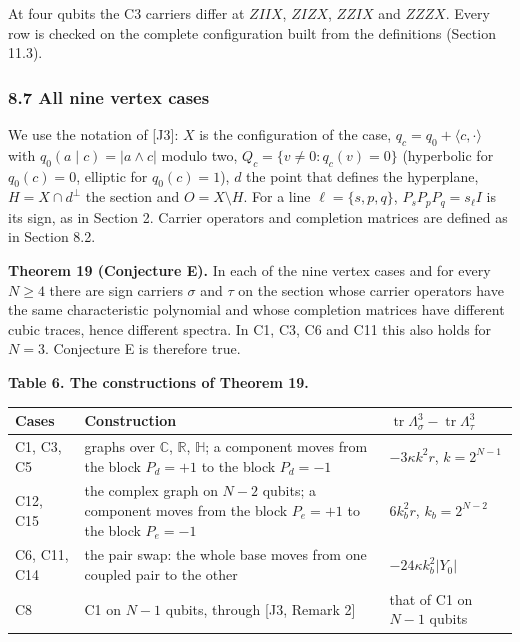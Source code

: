 \documentclass[11pt,a4paper]{article}
\begin{document}
At four qubits the C3 carriers differ at \(ZIIX\), \(ZIZX\), \(ZZIX\) and \(ZZZX\). Every row is checked on the
complete configuration built from the definitions (Section 11.3).

\subsubsection{8.7 All nine vertex cases}\label{87-all-nine-vertex-cases}

We use the notation of {[}J3{]}: \(X\) is the configuration of the case, \(q_c=q_0+\langle c,\cdot\rangle\) with
\(q_0(a\mid c)=|a\wedge c|\) modulo two, \(Q_c=\{v\neq0:q_c(v)=0\}\) (hyperbolic for \(q_0(c)=0\), elliptic for
\(q_0(c)=1\)), \(d\) the point that defines the hyperplane, \(H=X\cap d^\perp\) the section and \(O=X\setminus H\).
For a line \(\ell=\{s,p,q\}\), \(P_sP_pP_q=s_\ell I\) is its sign, as in Section 2. Carrier operators and
completion matrices are defined as
in Section 8.2.

\textbf{Theorem 19 (Conjecture E).} In each of the nine vertex cases and for every \(N\ge4\) there are sign
carriers \(\sigma\) and \(\tau\) on the section whose carrier operators have the same characteristic polynomial
and whose completion matrices have different cubic traces, hence different spectra. In C1, C3, C6 and
C11 this also holds for \(N=3\). Conjecture E is therefore true.

\textbf{Table 6. The constructions of Theorem 19.}

{\def\LTcaptype{none} %
{\small
\begin{longtable}[]{@{}>{\raggedright\arraybackslash}p{}>{\raggedright\arraybackslash}p{}>{\raggedright\arraybackslash}p{}@{}}
\toprule\noalign{}
Cases & Construction & \(\operatorname{tr}\Lambda_\sigma^3-\operatorname{tr}\Lambda_\tau^3\) \\
\midrule\noalign{}
\endhead
\bottomrule\noalign{}
\endlastfoot
C1, C3, C5 & graphs over \(\mathbb C\), \(\mathbb R\), \(\mathbb H\); a component moves from the block \(P_d=+1\) to the block \(P_d=-1\) & \(-3\kappa k^2r\), \(k=2^{N-1}\) \\
C12, C15 & the complex graph on \(N-2\) qubits; a component moves from the block \(P_e=+1\) to the block \(P_e=-1\) & \(6k_b^2r\), \(k_b=2^{N-2}\) \\
C6, C11, C14 & the pair swap: the whole base moves from one coupled pair to the other & \(-24\kappa k_b^2\lvert Y_0\rvert\) \\
C8 & C1 on \(N-1\) qubits, through {[}J3, Remark 2{]} & that of C1 on \(N-1\) qubits \\
\end{longtable}
}
}
\end{document}

